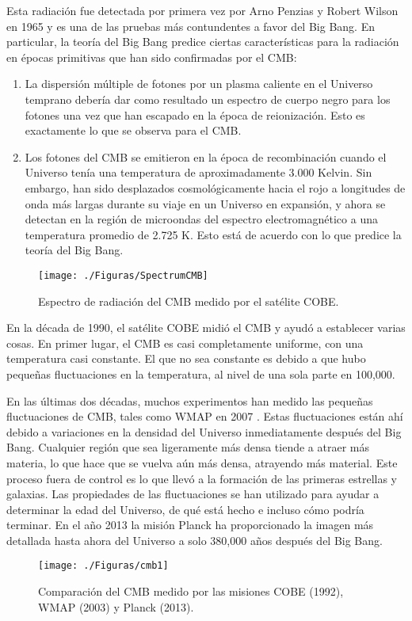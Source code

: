 \documentclass[a4paper,openright,12pt]{book}
\begin{document}
Esta radiación fue detectada por primera vez por Arno Penzias y Robert Wilson \cite{1.1.2.1} en 1965 y es una de las pruebas más contundentes a favor del Big Bang. En particular, la teoría del Big Bang predice ciertas características para la radiación en épocas primitivas que han sido confirmadas por el CMB:

\begin{enumerate}
\item La dispersión múltiple de fotones por un plasma caliente en el Universo temprano debería dar como resultado un espectro de cuerpo negro para los fotones una vez que han escapado en la época de reionización. Esto es exactamente lo que se observa para el CMB.
\item Los fotones del CMB se emitieron en la época de recombinación cuando el Universo tenía una temperatura de aproximadamente 3.000 Kelvin. Sin embargo, han sido desplazados cosmológicamente hacia el rojo a longitudes de onda más largas durante su viaje en un Universo en expansión, y ahora se detectan en la región de microondas del espectro electromagnético a una temperatura promedio de 2.725 K. Esto está de acuerdo con lo que predice la teoría del Big Bang. 
\end{enumerate}
\begin{figure}
\centering
  \texttt{[image: ./Figuras/SpectrumCMB]}
  \caption{\footnotesize{Espectro de radiación del CMB medido por el satélite COBE.}}
  \label{fig 1.3}
\end{figure}
En la década de 1990, el satélite COBE midió el CMB  y ayudó a establecer varias cosas. En primer lugar, el CMB es casi completamente uniforme, con una temperatura casi constante. El que no sea constante es debido a que hubo pequeñas fluctuaciones en la temperatura, al nivel de una sola parte en 100,000. 

En las últimas dos décadas, muchos experimentos han medido las pequeñas fluctuaciones de CMB, tales como WMAP en 2007 \cite{1.1.3} . Estas fluctuaciones están ahí debido a variaciones en la densidad del Universo inmediatamente después del Big Bang. Cualquier región que sea ligeramente más densa tiende a atraer más materia, lo que hace que se vuelva aún más densa, atrayendo más material. Este proceso fuera de control es lo que llevó a la formación de las primeras estrellas y galaxias. Las propiedades de las fluctuaciones se han utilizado para ayudar a determinar la edad del Universo, de qué está hecho e incluso cómo podría terminar. En el año 2013 la misión Planck \cite{1.1.4} ha proporcionado la imagen más detallada hasta ahora del Universo a solo 380,000 años después del Big Bang.
\begin{figure}
\centering
  \texttt{[image: ./Figuras/cmb1]}
  \caption{\footnotesize{Comparación del CMB medido por las misiones COBE (1992), WMAP (2003) y Planck (2013).}}
  \label{fig 1.4}
\end{figure}
\end{document}
